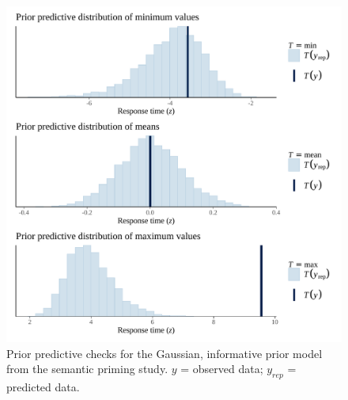 \documentclass[
  12pt,
  man,floatsintext]{apa7}
\begin{document}
\begin{figure}

{\centering \includegraphics[width=0.8\linewidth]{../semanticpriming/bayesian_analysis/prior_predictive_checks/plots/semanticpriming_priorpredictivecheck_informativepriors} 

}

\caption{Prior predictive checks for the Gaussian, informative prior model from the semantic priming study. \(y\) = observed data; \(y_{rep}\) = predicted data.}\label{fig:semanticpriming-priorpredictivecheck-informativepriors}
\end{figure}
\end{document}
